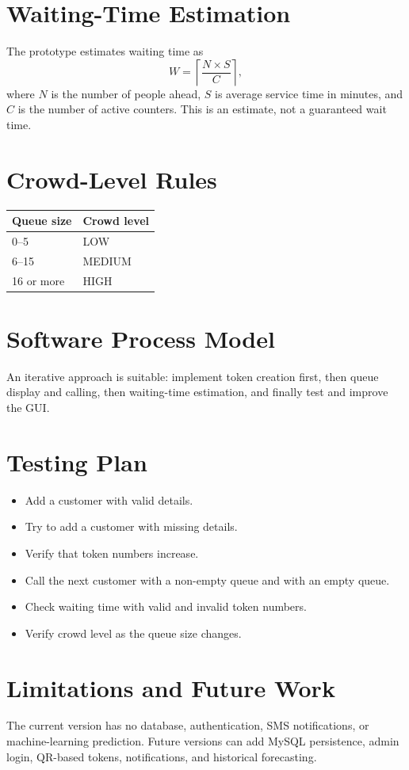 \documentclass[12pt,a4paper]{article}
\begin{document}
\section{Waiting-Time Estimation}
The prototype estimates waiting time as
\[
W = \left\lceil \frac{N \times S}{C} \right\rceil,
\]
where \(N\) is the number of people ahead, \(S\) is average service time in minutes, and \(C\)
is the number of active counters. This is an estimate, not a guaranteed wait time.
\section{Crowd-Level Rules}
\begin{center}
\begin{tabular}{ll}
\toprule
Queue size & Crowd level \\
\midrule
0--5 & LOW \\
6--15 & MEDIUM \\
16 or more & HIGH \\
\bottomrule
\end{tabular}
\end{center}
\section{Software Process Model}
An iterative approach is suitable: implement token creation first, then queue display and calling,
then waiting-time estimation, and finally test and improve the GUI.
\section{Testing Plan}
\begin{itemize}
\item Add a customer with valid details.
\item Try to add a customer with missing details.
\item Verify that token numbers increase.
\item Call the next customer with a non-empty queue and with an empty queue.
\item Check waiting time with valid and invalid token numbers.
\item Verify crowd level as the queue size changes.
\end{itemize}
\section{Limitations and Future Work}
The current version has no database, authentication, SMS notifications, or machine-learning prediction.
Future versions can add MySQL persistence, admin login, QR-based tokens, notifications, and historical forecasting.
\end{document}
